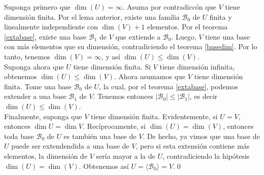 \dem Suponga primero que $\dim(U)=\infty$. Asuma por contradicc\'on que $V$ tiene dimensi\'on finita. Por el lema anterior, existe una familia $\mathcal{B}_0$ de $U$ finita y linealmente independiente con $\dim(V)+1$ elementos. Por el teorema \ref{extabase}, existe una base $\mathcal{B}_1$ de $V$ que extiende a $\mathcal{B}_0$. Luego, $V$ tiene una base con m\'as elementos que su dimensi\'on, contradiciendo el teorema \ref{basedim}. Por lo tanto, tenemos $\dim(V)=\infty$, y as\'i $\dim(U)\le\dim(V)$.\\
Suponga ahora que $U$ tiene dimensi\'on finita. Si $V$ tiene dimensi\'on infinita, obtenemos $\dim(U)\le\dim(V)$. Ahora asumamos que $V$ tiene dimensi\'on finita. Tome una base $\mathcal{B}_0$ de $U$, la cual, por el teorema \ref{extabase}, podemos extender a una base $\mathcal{B}_1$ de $V$. Tenemos entonces $|\mathcal{B}_0|\le|\mathcal{B}_1|$, es decir $\dim(U)\le\dim(V)$.\\
Finalmente, suponga que $V$ tiene dimensi\'on finita. Evidentemente, si $U=V$, entonces $\dim U=\dim V$. Recíprocamente, si $\dim(U)=\dim(V)$, entonces toda base $\mathcal{B}_0$ de $U$ es tambi\'en una base de $V$. De hecho, ya vimos que una base de $U$ puede ser extendendida a una base de $V$, pero si esta extensi\'on contiene m\'as elementos, la dimensi\'on de $V$ ser\'ia mayor a la de $U$, contradiciendo la hip\'otesis $\dim(U)=\dim(V)$. Obtenemos as\'i $U=\langle \mathcal{B}_0\rangle=V$.\qed

